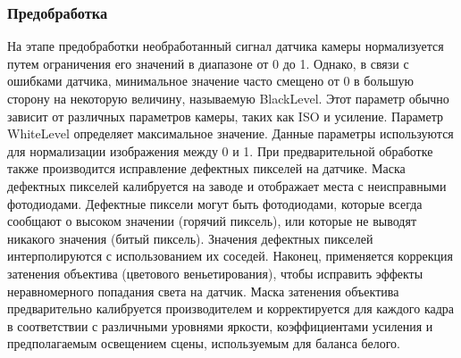 \subsubsection{Предобработка}

На этапе предобработки необработанный сигнал датчика камеры нормализуется путем ограничения его значений в диапазоне от 0 до 1. Однако, в связи с ошибками датчика, минимальное значение часто смещено от 0 в большую сторону на некоторую величину, называемую BlackLevel. Этот параметр обычно зависит от различных параметров камеры, таких как ISO и усиление. Параметр WhiteLevel определяет максимальное значение. Данные параметры используются для нормализации изображения между 0 и 1. При предварительной обработке также производится исправление дефектных пикселей на датчике. Маска дефектных пикселей калибруется на заводе и отображает места с неисправными фотодиодами. Дефектные пиксели могут быть фотодиодами, которые всегда сообщают о высоком значении (горячий пиксель), или которые не выводят никакого значения (битый пиксель). Значения дефектных пикселей интерполируются с использованием их соседей. Наконец, применяется коррекция затенения объектива (цветового веньетирования), чтобы исправить эффекты неравномерного попадания света на датчик. Маска затенения объектива предварительно калибруется производителем и корректируется для каждого кадра в соответствии с различными уровнями яркости, коэффициентами усиления и предполагаемым освещением сцены, используемым для баланса белого.